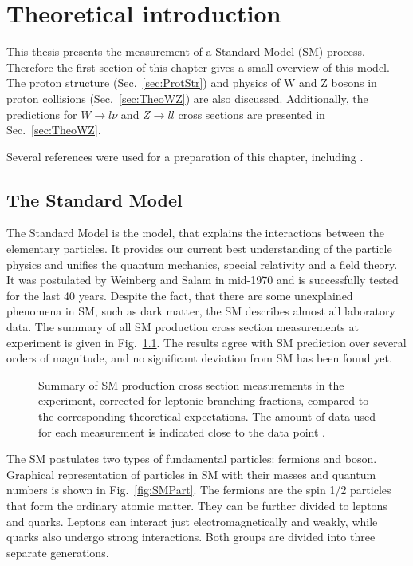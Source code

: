 \chapter{Theoretical introduction}\label{chap:Theory}
\minitoc
This thesis presents the measurement of a Standard Model (SM) process. Therefore the first section of this chapter gives a small overview of this model. The proton structure (Sec.~\ref{sec:ProtStr}) and physics of W and Z bosons in proton collisions (Sec.~\ref{sec:TheoWZ}) are also discussed. Additionally, the predictions for $W\to l\nu$ and $Z \to ll$ cross sections are presented in Sec.~\ref{sec:TheoWZ}.

Several references were used for a preparation of this chapter, including \cite{QPrim, Okun}.
\section{The Standard Model}

The Standard Model is the model, that explains the interactions between the elementary particles. It provides our current best understanding of the particle physics and unifies the quantum mechanics, special relativity and a field theory. It was postulated by Weinberg and Salam in mid-1970\cite{SM1, SM2, SM3} and is successfully tested for the last 40 years. Despite the fact, that there are some unexplained phenomena in SM, such as dark matter\cite{Planck2015}, the SM describes almost all laboratory data. The summary of all SM production cross section measurements at \atlas experiment is given in Fig.~\ref{fig:SMxsec}. The results agree with SM prediction over several orders of magnitude, and no significant deviation from SM has been found yet.

\begin{figure}[!tpb]
\caption{Summary of SM production cross section measurements in the \atlas experiment, corrected for leptonic branching fractions, compared to the corresponding theoretical expectations. The amount of data used for each measurement is indicated close to the data point \cite{SMPubRes}.}
\label{fig:SMxsec}
\end{figure}

The SM postulates two types of fundamental particles: fermions and boson. Graphical representation of particles in SM with their masses and quantum numbers is shown in Fig.~\ref{fig:SMPart}. The fermions are the spin 1/2 particles that form the ordinary atomic matter. They can be further divided to leptons and quarks. Leptons can interact just electromagnetically and weakly, while quarks also undergo strong interactions. Both groups are divided into three separate generations.

